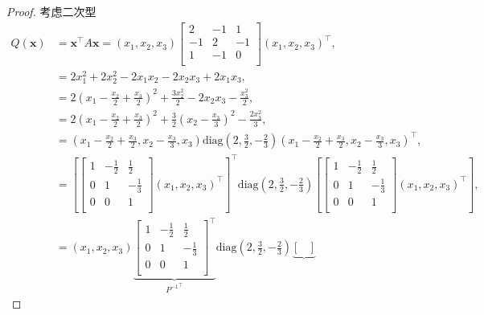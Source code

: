 \begin{proof}
考虑二次型
\[
\begin{aligned}
    Q \left(\boldsymbol{x}\right) &= \boldsymbol{x}^\top A \boldsymbol{x} = \left(x_1, x_2, x_3\right) \begin{bmatrix}
        2 & -1 & 1 \\
        -1 & 2 & -1 \\
        1 & -1 & 0 \\
    \end{bmatrix} \left(x_1, x_2, x_3\right)^\top, \\
    &= 2x_1^2 + 2x_2^2 - 2x_1x_2 - 2x_2x_3 + 2x_1x_3, \\
    &= 2 \left(x_1 - \frac{x_2}{2} + \frac{x_3}{2}\right)^2 + \frac{3x_2^2}{2} - 2x_2x_3 - \frac{x_3^2}{2}, \\
    &= 2 \left(x_1 - \frac{x_2}{2} + \frac{x_3}{2}\right)^2 + \frac{3}{2} \left(x_2 - \frac{x_3}{3}\right)^2 - \frac{2x_3^2}{3}, \\
    &= \left(x_1 - \frac{x_2}{2} + \frac{x_3}{2}, x_2 - \frac{x_3}{3}, x_3\right)
    \mathrm{diag}\left(2, \frac{3}{2}, -\frac{2}{3}\right) \left(x_1 - \frac{x_2}{2} + \frac{x_3}{2}, x_2 - \frac{x_3}{3}, x_3\right)^\top, \\
    &= \left[\begin{bmatrix}
        1 & -\frac{1}{2} & \frac{1}{2} \\
        0 & 1 & -\frac{1}{3} \\
        0 & 0 & 1 \\
    \end{bmatrix} \left(x_1, x_2, x_3\right)^\top\right]^\top \mathrm{diag}\left(2, \frac{3}{2}, -\frac{2}{3}\right) \left[\begin{bmatrix}
        1 & -\frac{1}{2} & \frac{1}{2} \\
        0 & 1 & -\frac{1}{3} \\
        0 & 0 & 1 \\
    \end{bmatrix} \left(x_1, x_2, x_3\right)^\top\right], \\
    &= \left(x_1, x_2, x_3\right) \underbrace{\begin{bmatrix}
        1 & -\frac{1}{2} & \frac{1}{2} \\
        0 & 1 & -\frac{1}{3} \\
        0 & 0 & 1 \\
    \end{bmatrix}^\top}_{{P^{-1}}^\top} \mathrm{diag}\left(2, \frac{3}{2}, -\frac{2}{3}\right) \underbrace{\begin{bmatrix}

\end{bmatrix}}
\end{aligned}\]
\end{proof}
